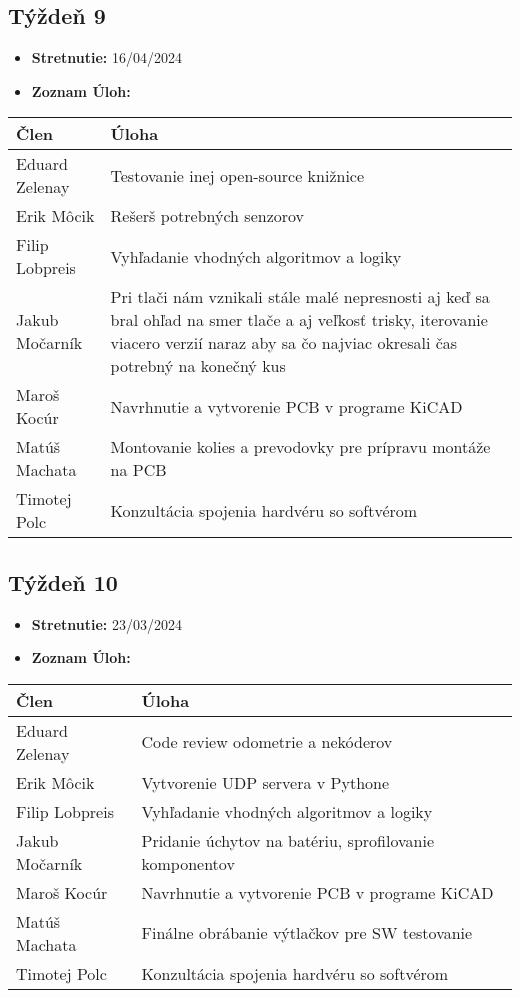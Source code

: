 \subsection{Týždeň 9}
\begin{itemize}
    \item \textbf{Stretnutie:} 16/04/2024
    \item \textbf{Zoznam Úloh:}
\end{itemize}

\begin{tabular}{|l|l|}
    \hline
    \textbf{Člen} & \textbf{Úloha} \\
    \hline
    Eduard Zelenay & Testovanie inej open-source knižnice \\
    Erik Môcik & Rešerš potrebných senzorov \\
    Filip Lobpreis & Vyhľadanie vhodných algoritmov a logiky \\
    Jakub Močarník & Pri tlači nám vznikali stále malé nepresnosti aj keď sa bral ohľad na smer tlače a aj veľkosť trisky, 
iterovanie viacero verzií naraz aby sa čo najviac okresali čas potrebný na konečný kus\\
    Maroš Kocúr & Navrhnutie a vytvorenie PCB v programe KiCAD \\
    Matúš Machata & Montovanie kolies a prevodovky pre prípravu montáže na PCB \\
    Timotej Polc & Konzultácia spojenia hardvéru so softvérom \\
    \hline
\end{tabular}
\subsection{Týždeň 10}
\begin{itemize}
    \item \textbf{Stretnutie:} 23/03/2024
    \item \textbf{Zoznam Úloh:}
\end{itemize}

\begin{tabular}{|l|l|}
    \hline
    \textbf{Člen} & \textbf{Úloha} \\
    \hline
    Eduard Zelenay & Code review odometrie a nekóderov \\
    Erik Môcik & Vytvorenie UDP servera v Pythone \\
    Filip Lobpreis & Vyhľadanie vhodných algoritmov a logiky \\
    Jakub Močarník & Pridanie úchytov na batériu, sprofilovanie komponentov \\
    Maroš Kocúr & Navrhnutie a vytvorenie PCB v programe KiCAD \\
    Matúš Machata & Finálne obrábanie výtlačkov pre SW testovanie \\
    Timotej Polc & Konzultácia spojenia hardvéru so softvérom \\
    \hline
\end{tabular}
